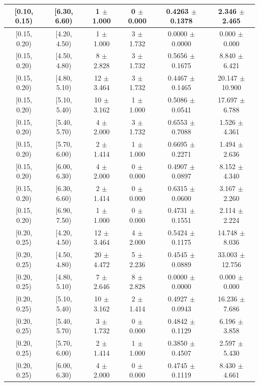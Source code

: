 \begin{longtable}{|c|c|c|c|c|c|}
\hline
[0.10, 0.15) & [6.30, 6.60) & 1 $\pm$ 1.000 & 0 $\pm$ 0.000 & 0.4263 $\pm$ 0.1378 & 2.346 $\pm$ 2.465 \\ 
\hline
[0.15, 0.20) & [4.20, 4.50) & 1 $\pm$ 1.000 & 3 $\pm$ 1.732 & 0.0000 $\pm$ 0.0000 & 0.000 $\pm$ 0.000 \\ 
\hline
[0.15, 0.20) & [4.50, 4.80) & 8 $\pm$ 2.828 & 3 $\pm$ 1.732 & 0.5656 $\pm$ 0.1675 & 8.840 $\pm$ 6.421 \\ 
\hline
[0.15, 0.20) & [4.80, 5.10) & 12 $\pm$ 3.464 & 3 $\pm$ 1.732 & 0.4467 $\pm$ 0.1465 & 20.147 $\pm$ 10.900 \\ 
\hline
[0.15, 0.20) & [5.10, 5.40) & 10 $\pm$ 3.162 & 1 $\pm$ 1.000 & 0.5086 $\pm$ 0.0541 & 17.697 $\pm$ 6.788 \\ 
\hline
[0.15, 0.20) & [5.40, 5.70) & 4 $\pm$ 2.000 & 3 $\pm$ 1.732 & 0.6553 $\pm$ 0.7088 & 1.526 $\pm$ 4.361 \\ 
\hline
[0.15, 0.20) & [5.70, 6.00) & 2 $\pm$ 1.414 & 1 $\pm$ 1.000 & 0.6695 $\pm$ 0.2271 & 1.494 $\pm$ 2.636 \\ 
\hline
[0.15, 0.20) & [6.00, 6.30) & 4 $\pm$ 2.000 & 0 $\pm$ 0.000 & 0.4907 $\pm$ 0.0897 & 8.152 $\pm$ 4.340 \\ 
\hline
[0.15, 0.20) & [6.30, 6.60) & 2 $\pm$ 1.414 & 0 $\pm$ 0.000 & 0.6315 $\pm$ 0.0600 & 3.167 $\pm$ 2.260 \\ 
\hline
[0.15, 0.20) & [6.90, 7.50) & 1 $\pm$ 1.000 & 0 $\pm$ 0.000 & 0.4731 $\pm$ 0.1551 & 2.114 $\pm$ 2.224 \\ 
\hline
[0.20, 0.25) & [4.20, 4.50) & 12 $\pm$ 3.464 & 4 $\pm$ 2.000 & 0.5424 $\pm$ 0.1175 & 14.748 $\pm$ 8.036 \\ 
\hline
[0.20, 0.25) & [4.50, 4.80) & 20 $\pm$ 4.472 & 5 $\pm$ 2.236 & 0.4545 $\pm$ 0.0889 & 33.003 $\pm$ 12.756 \\ 
\hline
[0.20, 0.25) & [4.80, 5.10) & 7 $\pm$ 2.646 & 8 $\pm$ 2.828 & 0.0000 $\pm$ 0.0000 & 0.000 $\pm$ 0.000 \\ 
\hline
[0.20, 0.25) & [5.10, 5.40) & 10 $\pm$ 3.162 & 2 $\pm$ 1.414 & 0.4927 $\pm$ 0.0943 & 16.236 $\pm$ 7.686 \\ 
\hline
[0.20, 0.25) & [5.40, 5.70) & 3 $\pm$ 1.732 & 0 $\pm$ 0.000 & 0.4842 $\pm$ 0.1129 & 6.196 $\pm$ 3.858 \\ 
\hline
[0.20, 0.25) & [5.70, 6.00) & 2 $\pm$ 1.414 & 1 $\pm$ 1.000 & 0.3850 $\pm$ 0.4507 & 2.597 $\pm$ 5.430 \\ 
\hline
[0.20, 0.25) & [6.00, 6.30) & 4 $\pm$ 2.000 & 0 $\pm$ 0.000 & 0.4745 $\pm$ 0.1119 & 8.430 $\pm$ 4.661 \\ 

\end{longtable}
